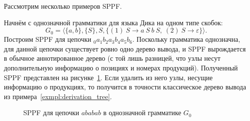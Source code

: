 Рассмотрим несколько примеров SPPF.

\begin{example}
    \label{exmpl:basic_sppf_unambiguous}
    Начнём с однозначной грамматики для языка Дика на одном типе скобок:
    \[
    G_0 = \langle \{a,b\}, \{S\}, S, \{(1)\ S \to a \ S \ b \ S, \ (2)\ S \to \varepsilon\} \rangle.
    \]
    Построим SPPF для цепочки $_0 a_1 b_2 a_3 b_4 a_5 b_6$.
    Поскольку грамматика однозначна, для данной цепочки существует ровно одно дерево вывода, и SPPF вырождается в обычное аннотированное дерево (с той лишь разницей, что узлы несут дополнительную информацию о позициях и номерах продукций).
    Полученный SPPF представлен на рисунке~\ref{fig:sppf_unambiguous}.
	Если удалить из него узлы, несущие информацию о продукциях, то получится в точности классическое дерево вывода из примера~\ref{exmpl:derivation_tree}.

    \begin{figure}
        \begin{center}
            \resizebox{0.9\textwidth}{!}{}
        \end{center}
        \caption{SPPF для цепочки $ababab$ в однозначной грамматике $G_0$}
        \label{fig:sppf_unambiguous}
    \end{figure}
\end{example}

